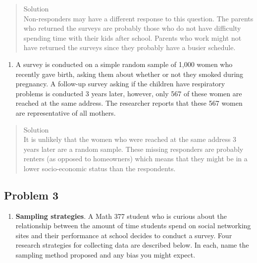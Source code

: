 \documentclass[
]{book}
\providecommand{\tightlist}{%
  \setlength{\itemsep}{0pt}\setlength{\parskip}{0pt}}
\begin{document}
\begin{quote}
Solution\\
Non-responders may have a different response to this question. The parents who returned the surveys are probably those who do not have difficulty spending time with their kids after school. Parents who work might not have returned the surveys since they probably have a busier schedule.
\end{quote}

\begin{enumerate}
\def\labelenumi{\alph{enumi}.}
\setcounter{enumi}{1}
\tightlist
\item
  A survey is conducted on a simple random sample of 1,000 women who recently gave birth, asking them about whether or not they smoked during pregnancy. A follow-up survey asking if the children have respiratory problems is conducted 3 years later, however, only 567 of these women are reached at the same address. The researcher reports that these 567 women are representative of all mothers.
\end{enumerate}

\begin{quote}
Solution\\
It is unlikely that the women who were reached at the same address 3 years later are a random sample. These missing responders are probably renters (as opposed to homeowners) which means that they might be in a lower socio-economic status than the respondents.
\end{quote}

\pagebreak

\hypertarget{problem-3-1}{%
\subsection{Problem 3}\label{problem-3-1}}

\begin{enumerate}
\def\labelenumi{\arabic{enumi}.}
\setcounter{enumi}{2}
\tightlist
\item
  \textbf{Sampling strategies}. A Math 377 student who is curious about the relationship between the amount of time students spend on social networking sites and their performance at school decides to conduct a survey. Four research strategies for collecting data are described below. In each, name the sampling method proposed and any bias you might expect.
\end{enumerate}
\end{document}
